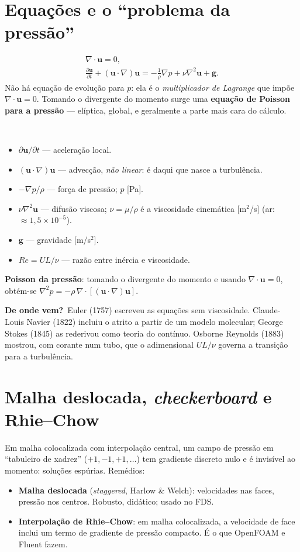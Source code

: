 \documentclass[10pt,a4paper,twocolumn,openany]{report}
\newcommand{\lead}[2]{\par\medskip\noindent{\color{#1}\bfseries #2}\ }
\newenvironment{conceito}[1]{\section{#1}}{\par}
\newenvironment{dicionario}[1][Dicionário da equação]{\lead{azul}{#1.}\small}{\par\medskip}
\newcommand{\origem}{\par\smallskip\noindent\textcolor{azul}{\textbf{De onde vem?}}\ }
\begin{document}
\begin{conceito}{Equações e o ``problema da pressão''}
\begin{gather*}
  \nabla\cdot\mathbf{u}=0,\\
  \frac{\partial\mathbf{u}}{\partial t}+(\mathbf{u}\cdot\nabla)\mathbf{u}
  = -\frac{1}{\rho}\nabla p + \nu\nabla^2\mathbf{u} + \mathbf{g}.
\end{gather*}
Não há equação de evolução para $p$: ela é o \emph{multiplicador de
Lagrange} que impõe $\nabla\cdot\mathbf{u}=0$. Tomando o divergente do
momento surge uma \textbf{equação de Poisson para a pressão} --- elíptica,
global, e geralmente a parte mais cara do cálculo.
\end{conceito}

\begin{dicionario}[Dicionário da equação: Navier--Stokes]
\begin{itemize}[leftmargin=*,nosep]
  \item $\partial\mathbf u/\partial t$ --- aceleração local.
  \item $(\mathbf u\cdot\nabla)\mathbf u$ --- advecção, \emph{não linear}: é
        daqui que nasce a turbulência.
  \item $-\nabla p/\rho$ --- força de pressão; $p$ [Pa].
  \item $\nu\nabla^2\mathbf u$ --- difusão viscosa; $\nu=\mu/\rho$ é a
        viscosidade cinemática [m$^2$/s] (ar: $\approx1{,}5\times10^{-5}$).
  \item $\mathbf g$ --- gravidade [m/s$^2$].
  \item $Re=UL/\nu$ --- razão entre inércia e viscosidade.
\end{itemize}
\textbf{Poisson da pressão}: tomando o divergente do momento e usando
$\nabla\cdot\mathbf u=0$, obtém-se $\nabla^2p=-\rho\,\nabla\cdot[(\mathbf u\cdot\nabla)\mathbf u]$.
\origem Euler (1757) escreveu as equações sem viscosidade. Claude-Louis
Navier (1822) incluiu o atrito a partir de um modelo molecular; George
Stokes (1845) as rederivou como teoria do contínuo. Osborne Reynolds (1883)
mostrou, com corante num tubo, que o adimensional $UL/\nu$ governa a
transição para a turbulência.
\end{dicionario}


\begin{conceito}{Malha deslocada, \emph{checkerboard} e Rhie--Chow}
Em malha colocalizada com interpolação central, um campo de pressão em
``tabuleiro de xadrez'' ($+1,-1,+1,\ldots$) tem gradiente discreto nulo e
é invisível ao momento: soluções espúrias. Remédios:
\begin{itemize}
  \item \textbf{Malha deslocada} (\emph{staggered}, Harlow \& Welch): velocidades
        nas faces, pressão nos centros. Robusto, didático; usado no FDS.
  \item \textbf{Interpolação de Rhie--Chow}: em malha colocalizada, a
        velocidade de face inclui um termo de gradiente de pressão
        compacto. É o que OpenFOAM e Fluent fazem.
\end{itemize}
\end{conceito}
\end{document}
